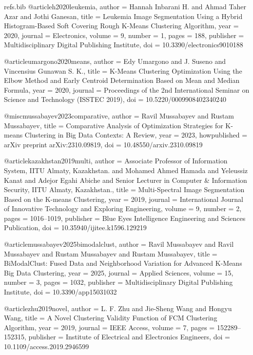 \begin{filecontents*}[overwrite]{refs.bib}
@article{h2020leukemia,
  author = {Hannah Inbarani H. and Ahmad Taher Azar and Jothi Ganesan},
  title = {{Leukemia Image Segmentation Using a Hybrid Histogram-Based Soft Covering Rough K-Means Clustering Algorithm}},
  year = {2020},
  journal = {Electronics},
  volume = {9},
  number = {1},
  pages = {188},
  publisher = {Multidisciplinary Digital Publishing Institute},
  doi = {10.3390/electronics9010188}
}

@article{umargono2020means,
  author = {Edy Umargono and J. Suseno and Vincensius Gunawan S. K.},
  title = {{K-Means Clustering Optimization Using the Elbow Method and Early Centroid Determination Based on Mean and Median Formula}},
  year = {2020},
  journal = {Proceedings of the 2nd International Seminar on Science and Technology (ISSTEC 2019)},
  doi = {10.5220/0009908402340240}
}

@misc{mussabayev2023comparative,
  author = {Ravil Mussabayev and Rustam Mussabayev},
  title = {{Comparative Analysis of Optimization Strategies for K-means Clustering in Big Data Contexts: A Review}},
  year = {2023},
  howpublished = {arXiv preprint arXiv:2310.09819},
  doi = {10.48550/arxiv.2310.09819}
}

@article{kazakhstan2019multi,
  author = {Associate Professor of Information System, IITU Almaty, Kazakhstan. and Mohamed Ahmed Hamada and Yeleussiz Kanat and Adejor Egahi Abiche and Senior Lecturer in Computer \& Information Security, IITU Almaty, Kazakhstan.},
  title = {{Multi-Spectral Image Segmentation Based on the K-means Clustering}},
  year = {2019},
  journal = {International Journal of Innovative Technology and Exploring Engineering},
  volume = {9},
  number = {2},
  pages = {1016--1019},
  publisher = {Blue Eyes Intelligence Engineering and Sciences Publication},
  doi = {10.35940/ijitee.k1596.129219}
}

@article{mussabayev2025bimodalclust,
  author = {Ravil Mussabayev and Ravil Mussabayev and Rustam Mussabayev and Rustam Mussabayev},
  title = {{BiModalClust: Fused Data and Neighborhood Variation for Advanced K-Means Big Data Clustering}},
  year = {2025},
  journal = {Applied Sciences},
  volume = {15},
  number = {3},
  pages = {1032},
  publisher = {Multidisciplinary Digital Publishing Institute},
  doi = {10.3390/app15031032}
}

@article{zhu2019novel,
  author = {L. F. Zhu and Jie{-}Sheng Wang and Hongyu Wang},
  title = {{A Novel Clustering Validity Function of FCM Clustering Algorithm}},
  year = {2019},
  journal = {IEEE Access},
  volume = {7},
  pages = {152289--152315},
  publisher = {Institute of Electrical and Electronics Engineers},
  doi = {10.1109/access.2019.2946599}
}


\end{filecontents*}
